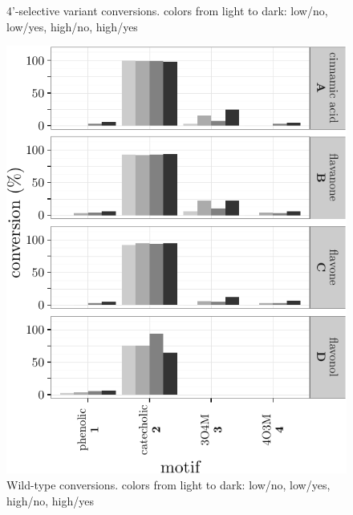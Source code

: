 \documentclass[]{tufte-handout}
\begin{document}
\begin{figure}
\caption{4'-selective variant conversions. colors from light to dark: low/no, low/yes, high/no, high/yes}
\end{figure}\begin{figure}
 \includegraphics{tufte_files/figure-latex/unnamed-chunk-15-4.pdf}
\caption{Wild-type conversions. colors from light to dark: low/no, low/yes, high/no, high/yes}
\end{figure}\begin{figure}

\end{figure}
\end{document}
